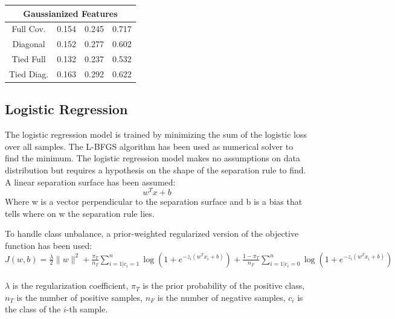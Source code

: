 \documentclass[12pt,a4paper]{article}
\begin{document}
\begin{multicols}{2}
{\begin{tabular}{@{}cccc@{}}
            \hline
            \multicolumn{4}{c}{Gaussianized Features}                                        \\
            \hline
            Full Cov.  & 0.154                & 0.245                 & 0.717                \\
            Diagonal   & 0.152                & 0.277                 & 0.602                \\
            Tied Full  & 0.132                & {\color{blue} 0.237 } & {\color{red} 0.532 } \\
            Tied Diag. & 0.163                & 0.292                 & 0.622                \\
        \end{tabular}
    }
\end{multicols}

\subsection{Logistic Regression}

The logistic regression model is trained by minimizing the sum of the logistic loss over all samples.
The L-BFGS algorithm has been used as numerical solver to find the minimum.
The logistic regression model makes no assumptions on data distribution but requires a hypothesis
on the shape of the separation rule to find. A linear separation surface has been assumed: \[ w^T x+b \]
Where w is a vector perpendicular to the separation surface and b is a bias that tells where on w the separation rule lies.

To handle class unbalance, a prior-weighted regularized version of the objective function has been used: \\

\begingroup{
\setlength{\thinmuskip}{0mu}
\hspace*{-30pt}
$J(w, b)=\frac{\lambda}{2}\|w\|^2+\frac{\pi_T}{n_T} \sum\limits_{i=\left.1\right| c_i=1 }^n \log \left(1+e^{-z_i (w^Tx_i+b)}\right)+\frac{1-\pi_T}{n_F} \sum\limits_{i=\left.1\right| c_i=0 }^n \log \left(1+e^{-z_i (w^Tx_i+b)}\right)$ \\ \\
}\endgroup
\(\lambda\) is the regularization coefficient, \(\pi_T\) is the prior probability of the positive class, \(n_T\) is the number of positive samples, \(n_F\) is the number of negative samples, \(c_i\) is the class of the \(i\)-th sample.
\end{document}
